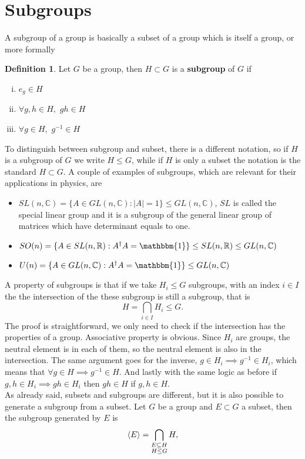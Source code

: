 \documentclass[12pt]{book}
\theoremstyle{plain}
\newcommand{\R}{\mathbb{R}}
\newcommand{\I}{\mathbbm{1}}
\newcommand{\C}{\mathbb{C}}
\renewcommand{\H}{\mathcal{H}}
\theoremstyle{definition}
\newtheorem{dfn}[thm]{Definition}
\theoremstyle{remark}
\begin{document}
\section{Subgroups}
A subgroup of a group is basically a subset of a group which is itself a group, or more formally
\begin{dfn}
Let $G$ be a group, then $H\subset G$ is a \textbf{subgroup} of $G$ if
\begin{enumerate}[i.]
	\item $e_g \in H$
	\item $\forall g,h \in H,$ $gh\in H$
	\item $\forall g\in H,$ $g^{-1}\in H$
\end{enumerate}
\end{dfn}
To distinguish between subgroup and subset, there is a different notation, so if $H$ is a subgroup of $G$ we write $H\leq G$, while if $H$ is only a subset the notation is the standard $H\subset G$. A couple of examples of subgroups, which are relevant for their applications in physics, are
\begin{itemize}
\item $SL(n,\C) = \{A\in GL(n,\C): |A| = 1\}\leq GL(n,\C)$, $SL$ is called the special linear group and it is a subgroup of the general linear group of matrices which have determinant equals to one.
\item $SO(n) = \{A\in SL(n,\R) : A^\dagger A = \I\}\leq SL(n,\R)\leq GL(n,\C)$ 
\item $U(n) = \{A\in GL(n,\C):A^\dagger A= \I \} \leq GL(n,\C)$
\end{itemize}
A property of subgroups is that if we take $H_i\leq G$ subgroups, with an index $i\in I$ the the intersection of the these subgroup is still a subgroup, that is
\[H = \bigcap_{i\in I} H_i \leq G.\]
The proof is straightforward, we only need to check if the intersection has the properties of a group. Associative property is obvious. Since $H_i$ are groups, the neutral element is in each of them, so the neutral element is also in the intersection. The same argument goes for the inverse, $g\in H_i \implies g^{-1}\in H_i$, which means that $\forall g\in H \implies g^{-1}\in H$. And lastly with the same logic as before if $g,h\in H_i\implies gh \in H_i$ then $gh\in H$ if $g,h\in H$.\\
As already said, subsets and subgroups are different, but it is also possible to generate a subgroup from a subset. Let $G$ be a group and $E\subset G$ a subset, then the subgroup generated by $E$ is
\[\braket{E} = \bigcap_{\substack{E\subseteq H\\H\leq G}} H,\]
\end{document}
